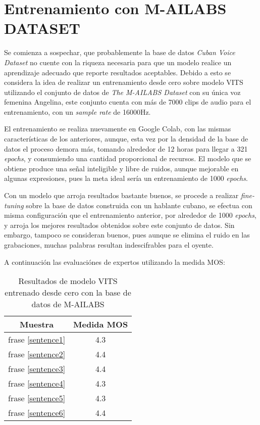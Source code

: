 \section{Entrenamiento con M-AILABS DATASET}
Se comienza a sospechar, que probablemente la base de datos \textit{Cuban Voice Dataset} no cuente con la riqueza necesaria para que un modelo realice un aprendizaje adecuado que reporte resultados aceptables. Debido a esto se considera la idea de realizar un entrenamiento desde cero sobre modelo VITS utilizando el conjunto de datos de \textit{The M-AILABS Dataset} con su única voz femenina Angelina, este conjunto cuenta con más de 7000 clips de audio para el entrenamiento, con un \textit{sample rate} de 16000Hz.

El entrenamiento se realiza nuevamente en Google Colab, con las mismas características de los anteriores, aunque, esta vez por la densidad de la base de datos el proceso demora más, tomando alrededor de 12 horas para llegar a 321 \textit{epochs}, y consumiendo una cantidad proporcional de recursos. El modelo que se obtiene produce una señal inteligible y libre de ruidos, aunque mejorable en algunas expresiones, pues la meta ideal sería un entrenamiento de 1000 \textit{epochs}.

Con un modelo que arroja resultados bastante buenos, se procede a realizar \textit{fine-tuning} sobre la base de datos construida con un hablante cubano, se efectua con misma configuración que el entrenamiento anterior, por alrededor de 1000 \textit{epochs}, y arroja los mejores resultados obtenidos sobre este conjunto de datos. Sin embargo, tampoco se consideran buenos, pues aunque se elimina el ruido en las grabaciones, muchas palabras resultan indescifrables para el oyente.

A continuación las evaluaciónes de expertos utilizando la medida MOS:


\begin{table}[H]
	\begin{center} 
\begin{tabular}{ |c|c| } 
	\hline
	Muestra & Medida MOS \\
	\hline
	frase \ref{sentence1} & 4.3 \\
	frase \ref{sentence2} & 4.4 \\
	frase \ref{sentence3} & 4.4 \\
	frase \ref{sentence4} & 4.3 \\
	frase \ref{sentence5} & 4.3 \\
	frase \ref{sentence6} & 4.4 \\
	\hline
\end{tabular}
\caption{Resultados de modelo VITS entrenado desde cero con la base de datos de M-AILABS} 
\end{center}
\end{table}
	
